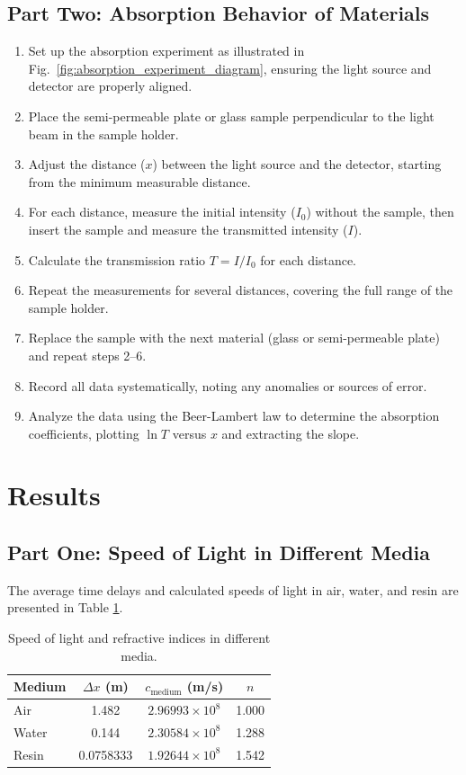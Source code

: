 \documentclass[journal]{IEEEtran}
\begin{document}
\subsection{Part Two: Absorption Behavior of Materials}
\begin{enumerate}
    \item Set up the absorption experiment as illustrated in Fig.~\ref{fig:absorption_experiment_diagram}, ensuring the light source and detector are properly aligned.
    \item Place the semi-permeable plate or glass sample perpendicular to the light beam in the sample holder.
    \item Adjust the distance ($x$) between the light source and the detector, starting from the minimum measurable distance.
    \item For each distance, measure the initial intensity ($I_0$) without the sample, then insert the sample and measure the transmitted intensity ($I$).
    \item Calculate the transmission ratio $T = I/I_0$ for each distance.
    \item Repeat the measurements for several distances, covering the full range of the sample holder.
    \item Replace the sample with the next material (glass or semi-permeable plate) and repeat steps 2--6.
    \item Record all data systematically, noting any anomalies or sources of error.
    \item Analyze the data using the Beer-Lambert law to determine the absorption coefficients, plotting $\ln T$ versus $x$ and extracting the slope.
\end{enumerate}

\section{Results}

\subsection{Part One: Speed of Light in Different Media}
The average time delays and calculated speeds of light in air, water, and resin are presented in Table \ref{tab:speed_of_light}.

\begin{table}[H]
    \centering
    \caption{Speed of light and refractive indices in different media.}
    \label{tab:speed_of_light}
    \begin{tabular}{@{}lccc@{}}
        \toprule
        Medium & $\Delta x$ (m) & $c_{\text{medium}}$ (m/s) & $n$ \\ \midrule
        Air    & 1.482          & $2.96993 \times 10^8$    & 1.000 \\
        Water  & 0.144          & $2.30584 \times 10^8$    & 1.288 \\
        Resin  & 0.0758333      & $1.92644 \times 10^8$    & 1.542 \\ \bottomrule
    \end{tabular}
\end{table}
\end{document}

